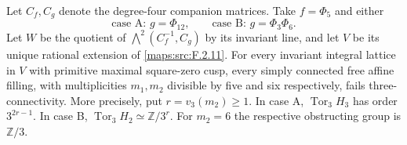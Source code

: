 \begin{theorem}\label{maps:src:F.2.13}


Let $C_f,C_g$ denote the degree-four companion matrices.
Take $f=\Phi_5$ and either
\[
 \text{case A: }g=\Phi_{12},\qquad
 \text{case B: }g=\Phi_3\Phi_6.
 \tag{F.36}\label{maps:eq:F.36}
\]
Let $W$ be the quotient of
$\bigwedge^2(C_f^{-1},C_g)$ by its invariant line, and
let $V$ be its unique rational extension of \ref{maps:src:F.2.11}.
For every invariant integral lattice in $V$ with primitive
maximal square-zero cusp, every simply connected free affine
filling, with multiplicities $m_1,m_2$ divisible by five and
six respectively, fails three-connectivity.
More precisely, put $r=v_3(m_2)\geq1$.
In case A, $\operatorname{Tor}_3 H_3$ has order
$3^{2r-1}$.  In case B,
$\operatorname{Tor}_3 H_2\simeq\mathbb Z/3^r$.
For $m_2=6$ the respective obstructing group is $\mathbb Z/3$.

\end{theorem}



